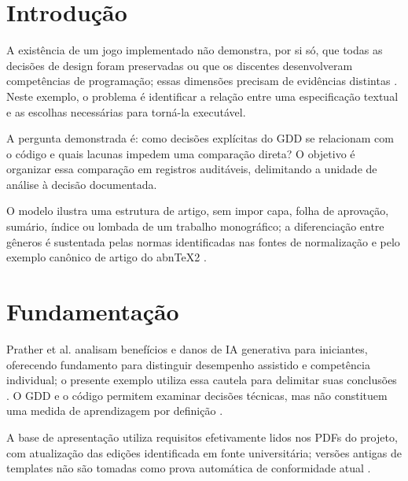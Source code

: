 \section{Introdução}
A existência de um jogo implementado não demonstra, por si só, que todas as decisões de design foram preservadas ou que os discentes desenvolveram competências de programação; essas dimensões precisam de evidências distintas \citep{prather2024}. Neste exemplo, o problema é identificar a relação entre uma especificação textual e as escolhas necessárias para torná-la executável.

A pergunta demonstrada é: como decisões explícitas do GDD se relacionam com o código e quais lacunas impedem uma comparação direta? O objetivo é organizar essa comparação em registros auditáveis, delimitando a unidade de análise à decisão documentada.

O modelo ilustra uma estrutura de artigo, sem impor capa, folha de aprovação, sumário, índice ou lombada de um trabalho monográfico; a diferenciação entre gêneros é sustentada pelas normas identificadas nas fontes de normalização e pelo exemplo canônico de artigo do abnTeX2 \citep{ufes2026,abntex2018}.

\section{Fundamentação}
Prather et al. analisam benefícios e danos de IA generativa para iniciantes, oferecendo fundamento para distinguir desempenho assistido e competência individual; o presente exemplo utiliza essa cautela para delimitar suas conclusões \citep{prather2024}. O GDD e o código permitem examinar decisões técnicas, mas não constituem uma medida de aprendizagem por definição \citep{prather2024}.

A base de apresentação utiliza requisitos efetivamente lidos nos PDFs do projeto, com atualização das edições identificada em fonte universitária; versões antigas de templates não são tomadas como prova automática de conformidade atual \citep{ufes2026}.
